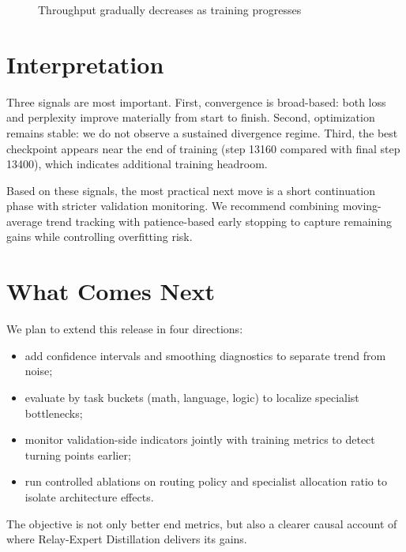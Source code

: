 \documentclass[12pt,a4paper]{article}
\begin{document}
\begin{figure}[H]
\centering
{}
\caption{Throughput gradually decreases as training progresses}
\end{figure}

\section{Interpretation}
Three signals are most important. First, convergence is broad-based: both loss and perplexity improve materially from start to finish. Second, optimization remains stable: we do not observe a sustained divergence regime. Third, the best checkpoint appears near the end of training (step 13160 compared with final step 13400), which indicates additional training headroom.

Based on these signals, the most practical next move is a short continuation phase with stricter validation monitoring. We recommend combining moving-average trend tracking with patience-based early stopping to capture remaining gains while controlling overfitting risk.

\section{What Comes Next}
We plan to extend this release in four directions:
\begin{itemize}
  \item add confidence intervals and smoothing diagnostics to separate trend from noise;
  \item evaluate by task buckets (math, language, logic) to localize specialist bottlenecks;
  \item monitor validation-side indicators jointly with training metrics to detect turning points earlier;
  \item run controlled ablations on routing policy and specialist allocation ratio to isolate architecture effects.
\end{itemize}

The objective is not only better end metrics, but also a clearer causal account of where Relay-Expert Distillation delivers its gains.
\end{document}
